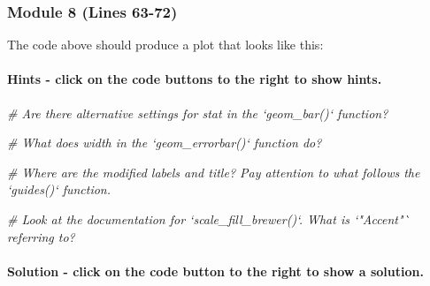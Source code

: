 \documentclass[
]{article}
\newenvironment{Shaded}{\begin{snugshade}}{\end{snugshade}}
\newcommand{\CommentTok}[1]{\textcolor[rgb]{0.56,0.35,0.01}{\textit{#1}}}
\begin{document}
\hypertarget{module-8-lines-63-72}{%
\subsubsection{Module 8 (Lines 63-72)}\label{module-8-lines-63-72}}

The code above should produce a plot that looks like this:

\hypertarget{hints---click-on-the-code-buttons-to-the-right-to-show-hints.-5}{%
\paragraph{Hints - click on the code buttons to the right to show
hints.}\label{hints---click-on-the-code-buttons-to-the-right-to-show-hints.-5}}

\begin{Shaded}
\begin{Highlighting}[]
\CommentTok{# Are there alternative settings for stat in the `geom_bar()` function?}
\end{Highlighting}
\end{Shaded}

\begin{Shaded}
\begin{Highlighting}[]
\CommentTok{# What does width in the `geom_errorbar()` function do?}
\end{Highlighting}
\end{Shaded}

\begin{Shaded}
\begin{Highlighting}[]
\CommentTok{# Where are the modified labels and title? Pay attention to what follows the `guides()` function.}
\end{Highlighting}
\end{Shaded}

\begin{Shaded}
\begin{Highlighting}[]
\CommentTok{# Look at the documentation for `scale_fill_brewer()`. What is `"Accent"` referring to?}
\end{Highlighting}
\end{Shaded}

\hypertarget{solution---click-on-the-code-button-to-the-right-to-show-a-solution.-3}{%
\paragraph{Solution - click on the code button to the right to show a
solution.}\label{solution---click-on-the-code-button-to-the-right-to-show-a-solution.-3}}
\end{document}
